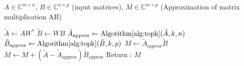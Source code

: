 \documentclass[onefignum,onetabnum]{siamart171218}
\begin{document}
\begin{algorithm}[H]
\caption{First-order approximation of matrix multiplication based on sparsification} \label{alg:mul_topk}
\begin{algorithmic}[1]
\Require $A \in \mathbb{C}^{m \times n}$, $B \in \mathbb{C}^{n \times p}$ (input matrices), 
\Ensure $M \in \mathbb{C}^{m \times p}$ (Approximation of matrix multiplication AB)

\State $\tilde{A} \gets AW^*$ 
\State $\tilde{B} \gets WB$ 
\State $\tilde{A}_{\text{approx}} \gets \text{Algorithm} \ref{alg:topk}(\tilde{A},k,n)$ 
\State $\tilde{B}_{\text{approx}}\gets \text{Algorithm} \ref{alg:topk}(\tilde{B},k,p)$
\State $M \gets \tilde{A}_{approx}\tilde{B}$
\State $M \gets M + (\tilde{A}-\tilde{A}_{\text{approx}})\tilde{B}_{\text{approx}}$
\State Return : $M$

\end{algorithmic}
\end{algorithm}
\end{document}
